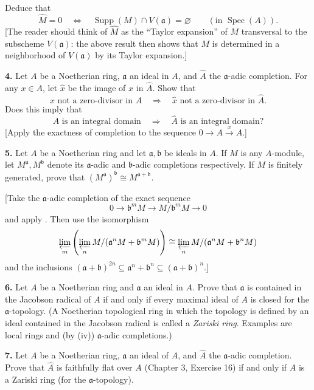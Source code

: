 Deduce that
\[
\widehat M=0\quad\Longleftrightarrow\quad\operatorname{Supp}(M)\cap V(\mathfrak a)=\varnothing\qquad(\text{in }\operatorname{Spec}(A)).
\]
[The reader should think of $\widehat M$ as the ``Taylor expansion'' of $M$ transversal to
the subscheme $V(\mathfrak a)$: the above result then shows that $M$ is determined in a
neighborhood of $V(\mathfrak a)$ by its Taylor expansion.]

\medskip
\noindent\textbf{4.} Let $A$ be a Noetherian ring, $\mathfrak a$ an ideal in $A$, and $\widehat A$ the $\mathfrak a$-adic completion.  For
any $x\in A$, let $\widehat x$ be the image of $x$ in $\widehat A$.  Show that
\[
x\text{ not a zero-divisor in }A\quad\Rightarrow\quad\widehat x\text{ not a zero-divisor in }\widehat A.
\]
Does this imply that
\[
A\text{ is an integral domain}\quad\Rightarrow\quad\widehat A\text{ is an integral domain}?
\]
[Apply the exactness of completion to the sequence $0\longrightarrow A\xrightarrow{x}A$.]

\medskip
\noindent\textbf{5.} Let $A$ be a Noetherian ring and let $\mathfrak a,\mathfrak b$ be ideals in $A$.  If $M$ is any $A$-module, let
$M^\mathfrak a,M^\mathfrak b$ denote its $\mathfrak a$-adic and $\mathfrak b$-adic completions respectively.  If $M$ is finitely
generated, prove that $(M^\mathfrak a)^\mathfrak b\cong M^{\mathfrak a+\mathfrak b}$.

[Take the $\mathfrak a$-adic completion of the exact sequence
\[
0\longrightarrow\mathfrak b^mM\longrightarrow M/\mathfrak b^mM\longrightarrow0
\]
and apply .  Then use the isomorphism
\[
\varprojlim_m\left(\varprojlim_n M/(\mathfrak a^nM+\mathfrak b^mM)\right)\cong
\varprojlim_n M/(\mathfrak a^nM+\mathfrak b^nM)
\]
and the inclusions $(\mathfrak a+\mathfrak b)^{2n}\subseteq\mathfrak a^n+\mathfrak b^n\subseteq(\mathfrak a+\mathfrak b)^n$.]

\medskip
\noindent\textbf{6.} Let $A$ be a Noetherian ring and $\mathfrak a$ an ideal in $A$.  Prove that $\mathfrak a$ is contained in the
Jacobson radical of $A$ if and only if every maximal ideal of $A$ is closed for the
$\mathfrak a$-topology.  (A Noetherian topological ring in which the topology is defined by
an ideal contained in the Jacobson radical is called a \emph{Zariski ring}.  Examples are
local rings and (by (iv)) $\mathfrak a$-adic completions.)

\medskip
\noindent\textbf{7.} Let $A$ be a Noetherian ring, $\mathfrak a$ an ideal of $A$, and $\widehat A$ the $\mathfrak a$-adic completion.  Prove
that $\widehat A$ is faithfully flat over $A$ (Chapter 3, Exercise 16) if and only if $A$ is a Zariski
ring (for the $\mathfrak a$-topology).

